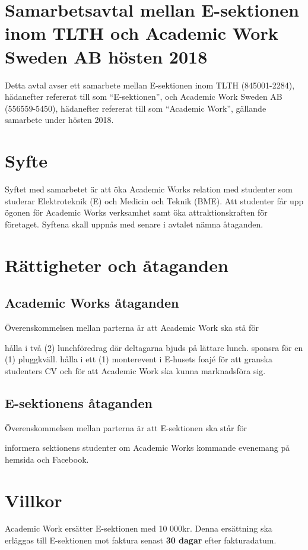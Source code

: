 \documentclass[10pt]{article}
\def\year{2018}
\def\doctitle{Samarbetsavtal mellan E-sektionen inom TLTH och Academic Work Sweden AB hösten {\year}}
\begin{document}
        \section*{\doctitle}
        Detta avtal avser ett samarbete mellan E-sektionen inom TLTH (845001-2284), hädanefter refererat till som “E-sektionen”, och Academic Work Sweden AB (556559-5450), hädanefter refererat till som “Academic Work”, gällande samarbete under hösten 2018.\\
        \section{Syfte}
        Syftet med samarbetet är att öka Academic Works relation med studenter som studerar Elektroteknik (E) och Medicin och Teknik (BME). Att studenter får upp ögonen för Academic Works verksamhet samt öka attraktionskraften för företaget. Syftena skall uppnås med senare i avtalet nämna åtaganden.
        \section{Rättigheter och åtaganden}
        \subsection{Academic Works åtaganden}
        Överenskommelsen mellan parterna är att Academic Work ska stå för
        \begin{attsatser}
            \att hålla i två (2) lunchföredrag där deltagarna bjuds på lättare lunch. 
            \att sponsra för en (1) pluggkväll.
            \att hålla i ett (1) monterevent i E-husets foajé för att granska studenters CV och för att Academic Work ska kunna marknadsföra sig.
        \end{attsatser}

        \subsection{E-sektionens åtaganden}
        Överenskommelsen mellan parterna är att E-sektionen ska står för
        \begin{attsatser}
            \att informera sektionens studenter om Academic Works kommande evenemang på hemsida och Facebook.            
        \end{attsatser}
        
        \section{Villkor}
        Academic Work ersätter E-sektionen med 10 000kr. Denna ersättning ska erläggas till E-sektionen mot faktura senast \textbf{30 dagar} efter fakturadatum.
        \newline
\end{document}
